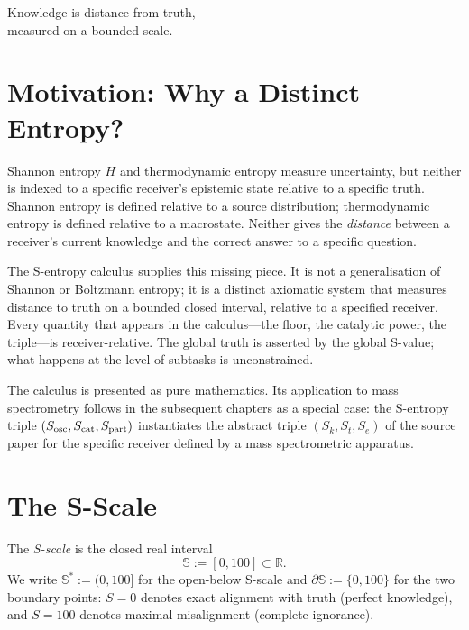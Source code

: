 
\epigraph{%
  Knowledge is distance from truth,\\
  measured on a bounded scale.%
}{}

\section{Motivation: Why a Distinct Entropy?}
\label{sec:ch13-motivation}

Shannon entropy $H$ and thermodynamic entropy measure uncertainty, but neither
is indexed to a specific receiver's epistemic state relative to a specific
truth.  Shannon entropy is defined relative to a source distribution;
thermodynamic entropy is defined relative to a macrostate.  Neither gives the
\emph{distance} between a receiver's current knowledge and the correct answer to
a specific question.

The S-entropy calculus supplies this missing piece.  It is not a generalisation
of Shannon or Boltzmann entropy; it is a distinct axiomatic system that measures
distance to truth on a bounded closed interval, relative to a specified
receiver.  Every quantity that appears in the calculus---the floor, the
catalytic power, the triple---is receiver-relative.  The global truth is
asserted by the global S-value; what happens at the level of subtasks is
unconstrained.

The calculus is presented as pure mathematics.  Its application to mass
spectrometry follows in the subsequent chapters as a special case: the
S-entropy triple $(S_{\mathrm{osc}}, S_{\mathrm{cat}}, S_{\mathrm{part}})$ instantiates the abstract triple
$(S_k, S_t, S_e)$ of the source paper for the specific receiver defined by a
mass spectrometric apparatus.

\section{The S-Scale}
\label{sec:ch13-scale}

\begin{definition}[S-scale]\label{def:sscale-mono}
The \emph{S-scale} is the closed real interval
\[
  \mathbb{S} := [0,100] \subset \mathbb{R}.
\]
We write $\mathbb{S}^{*} := (0,100]$ for the open-below S-scale and
$\partial\mathbb{S} := \{0,100\}$ for the two boundary points: $S=0$ denotes
exact alignment with truth (perfect knowledge), and $S=100$ denotes maximal
misalignment (complete ignorance).
\end{definition}

